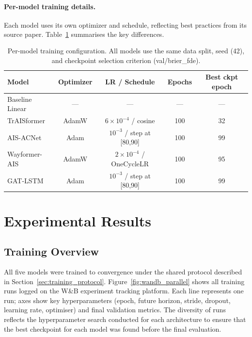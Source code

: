 \documentclass[12pt, a4paper]{article}
\begin{document}
\paragraph{Per-model training details.}
Each model uses its own optimizer and schedule, reflecting best practices
from its source paper.  Table~\ref{tab:training_summary} summarises the
key differences.

\begin{table}[H]
  \centering
  \caption{Per-model training configuration. All models use the same
  data split, seed (42), and checkpoint selection criterion (val/brier\_fde).}
  \label{tab:training_summary}
  \begin{tabular}{lcccc}
    \toprule
    \textbf{Model} & \textbf{Optimizer} & \textbf{LR / Schedule}
                   & \textbf{Epochs} & \textbf{Best ckpt epoch} \\
    \midrule
    Baseline Linear & — & — & — & — \\
    TrAISformer     & AdamW & $6\!\times\!10^{-4}$ / cosine & 100 & 32 \\
    AIS-ACNet       & Adam  & $10^{-3}$ / step at [80,90]   & 100 & 99 \\
    Wayformer-AIS   & AdamW & $2\!\times\!10^{-4}$ / OneCycleLR & 100 & 95 \\
    GAT-LSTM        & Adam  & $10^{-3}$ / step at [80,90]       & 100 & 99 \\
    \bottomrule
  \end{tabular}
\end{table}

  \section{Experimental Results}
  \label{sec:experiments}

  \subsection{Training Overview}

  All five models were trained to convergence under the shared protocol described in
  Section~\ref{sec:training_protocol}.
  Figure~\ref{fig:wandb_parallel} shows all training runs logged on the W\&B
  experiment tracking platform.  Each line represents one run; axes show key
  hyperparameters (epoch, future horizon, stride, dropout, learning rate, optimiser)
  and final validation metrics.  The diversity of runs reflects the hyperparameter
  search conducted for each architecture to ensure that the best checkpoint for each
  model was found before the final evaluation.
\end{document}
